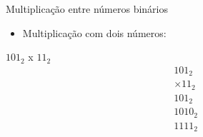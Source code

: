 
\begin{frame}{Multiplicação entre números binários}
    \begin{itemize}
        \item Multiplicação com dois números:
    \end{itemize}
    $101_{2}$ x $11_{2}$ \\[0.2cm]
    \[ \begin{array}{r} 101_{2} \\ \times 11_{2} \\ \hline 101_{2} \\ 1010_{2} \\ \hline 1111_{2} \end{array} \]
\end{frame}